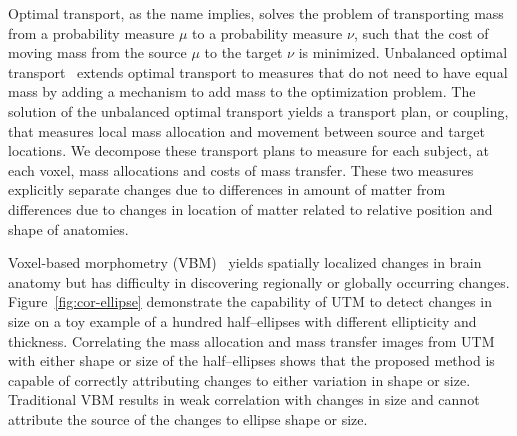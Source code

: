 \documentclass{llncs}
\begin{document}
Optimal transport, as the name implies, solves the problem of transporting mass
from a probability measure $\mu$ to a probability measure $\nu$, such that the
cost of moving mass from the source $\mu$ to the target $\nu$ is minimized.
Unbalanced optimal transport~\cite{guittet2002extended,benamou2003numerical}
extends optimal transport to measures that do not need to have equal mass by
adding a mechanism to add mass to the optimization problem. The solution of the
unbalanced optimal transport yields a transport plan, or coupling, that
measures local mass allocation and movement between source and target
locations. We decompose these transport plans to measure for each subject, at
each voxel, mass allocations and costs of mass transfer. These two measures
explicitly separate changes due to differences in amount of matter from
differences due to changes in location of matter related to relative position
and shape of anatomies. 

Voxel-based morphometry (VBM)~\cite{ashburner2000voxel} yields spatially
localized changes in brain anatomy but has difficulty in discovering regionally
or globally occurring changes. Figure~\ref{fig:cor-ellipse} demonstrate the
capability of UTM to detect changes in size on a toy example of a hundred
half--ellipses with different ellipticity and thickness.  Correlating the
mass allocation and mass transfer images from UTM with either shape or size of
the half--ellipses shows that the proposed method is capable of correctly
attributing changes to either variation in shape or size.  Traditional VBM
results in weak correlation with changes in size and cannot attribute the
source of the changes to ellipse shape or size.
\end{document}
